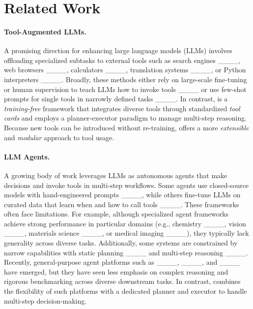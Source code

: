 \section{Related Work}
\label{sec:related}

\paragraph{Tool-Augmented LLMs.}
A promising direction for enhancing large language models (LLMs) involves offloading specialized subtasks to external tools such as search engines ____, web browsers ____, calculators ____, translation systems ____, or Python interpreters ____. Broadly, these methods either rely on large-scale fine-tuning or human supervision to teach LLMs how to invoke tools ____ or use few-shot prompts for single tools in narrowly defined tasks ____. In contrast, \model is a \emph{training-free} framework that integrates diverse tools through standardized \emph{tool cards} and employs a planner-executor paradigm to manage multi-step reasoning. Because new tools can be introduced without re-training, \model offers a more \emph{extensible} and \emph{modular} approach to tool usage. 

\paragraph{LLM Agents.} A growing body of work leverages LLMs as autonomous agents that make decisions and invoke tools in multi-step workflows. Some agents use closed-source models with hand-engineered prompts ____, while others fine-tune LLMs on curated data that learn when and how to call tools ____. These frameworks often face limitations. For example, although specialized agent frameworks achieve strong performance in particular domains (e.g., chemistry ____, vision ____, materials science ____, or medical imaging ____), they typically lack generality across diverse tasks. Additionally, some systems are constrained by narrow capabilities with static planning ____ and multi-step reasoning ____. Recently, general-purpose agent platforms such as \autogen ____, \gptplugin ____, and \langchain ____ have emerged, but they have seen less emphasis on complex reasoning and rigorous benchmarking across diverse downstream tasks. In contrast, \model combines the flexibility of such platforms with a dedicated planner and executor to handle multi-step decision-making. 


